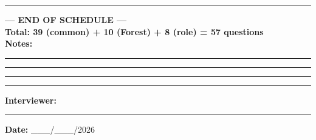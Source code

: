 \documentclass[10pt,a4paper]{article}
\begin{document}
\vspace{3pt}\noindent\rule{\textwidth}{1pt}
\begin{center}
{\large\bfseries --- END OF SCHEDULE ---}\\[2pt]
\textbf{Total: 39 (common) + 10 (Forest) + 8 (role) = 57 questions}\\[8pt]
\textbf{Notes:}\vspace{3pt}

\rule{\textwidth}{0.4pt}\vspace{3pt}
\rule{\textwidth}{0.4pt}\vspace{3pt}
\rule{\textwidth}{0.4pt}\vspace{3pt}
\rule{\textwidth}{0.4pt}\vspace{4pt}

\textbf{Interviewer:} \rule{5cm}{0.4pt}\qquad\textbf{Date:} \_\_\_/\_\_\_/2026
\end{center}
\end{document}
